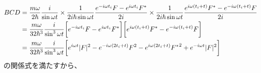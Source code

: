 \begin{subequations}
\begin{align}
    BCD
    &=
    \dfrac{m \omega}{2 \hbar}
    \dfrac{ i }{\sin \omega t}
\times
    \dfrac{1}{2 i \hbar \sin \omega t}
    \dfrac{
        e^{- i \omega t_i}
            F
    -
        e^{i \omega t_i}
            F^*
    }{2 i}
\times
    \dfrac{1}{2 i \hbar \sin \omega t}
    \dfrac{
        e^{i \omega (t_i + t)}
            F^*
    -
        e^{- i \omega (t_i + t)}
            F
    }{2 i}
\notag\\&
    =
    \dfrac{m \omega}{32 \hbar^3}
    \dfrac{ i }{\sin^3 \omega t}
    \bigg[
        e^{- i \omega t_i}
            F
    -
        e^{i \omega t_i}
            F^*
    \bigg]
    \bigg[
        e^{i \omega (t_i + t)}
            F^*
    -
        e^{- i \omega (t_i + t)}
            F
    \bigg]
\notag\\&
    =
    \dfrac{m \omega}{32 \hbar^3}
    \dfrac{ i }{\sin^3 \omega t}
    \bigg[
        e^{i \omega t}
        | F |^2
    -
        e^{- i \omega (2 t_i + t)}
            F^2
    -
        e^{i \omega (2 t_i + t)}
            {F^*}^2
    +
        e^{- i \omega t}
            | F |^2
    \bigg]
\end{align}
\end{subequations}
の関係式を満たすから、
